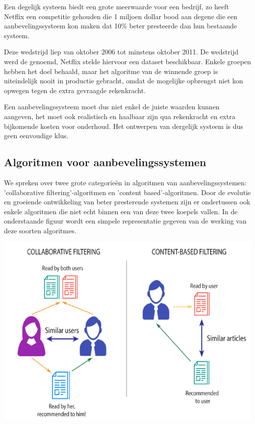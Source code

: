 Een degelijk systeem biedt een grote meerwaarde voor een bedrijf, zo heeft Netflix een competitie gehouden die 1 miljoen dollar bood aan degene die een aanbevelingssysteem kon maken dat 10\% beter presteerde dan hun bestaande systeem. 

Deze wedstrijd liep van oktober 2006 tot minstens oktober 2011. De wedstrijd werd de \cite{NetflixPrize} genoemd, Netflix stelde hiervoor een dataset beschikbaar. Enkele groepen hebben het doel behaald, maar het algoritme van de winnende groep is uiteindelijk nooit in productie gebracht, omdat de mogelijke opbrengst niet kon opwegen tegen de extra gevraagde rekenkracht. 

Een aanbevelingssysteem moet dus niet enkel de juiste waarden kunnen aangeven, het moet ook realistisch en haalbaar zijn qua rekenkracht en extra bijkomende kosten voor onderhoud. Het ontwerpen van dergelijk systeem is dus geen eenvoudige klus.

\subsection{Algoritmen voor aanbevelingssystemen}
\label{sec:Algoritmen voor aanbevelingssystemen}

We spreken over twee grote categorieën in algoritmen van aanbevelingssystemen: 'collaborative filtering'-algoritmen en 'content based'-algoritmen.  \autocite{Adamovicius2005} Door de evolutie en groeiende ontwikkeling van beter presterende systemen zijn er ondertussen ook enkele algoritmen die niet echt binnen een van deze twee koepels vallen. In de onderstaande figuur wordt een simpele representatie gegeven van de werking van deze soorten algoritmes.

	\includegraphics[width=\linewidth]{img/Content-based-filtering-and-Collaborative-filtering-recommendation}
	
